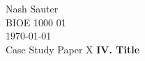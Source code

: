 \documentclass[12pt]{article}
\begin{document}
\noindent Nash Sauter \\
\noindent BIOE 1000 01 \\
\noindent \today \\
\noindent Case Study Paper X
\noindent \textbf{IV. Title}

\Blindtext
\end{document}
